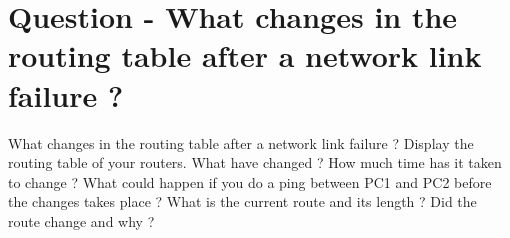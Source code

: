 \section{Question - What changes in the routing table after a network link failure ?}

\begin{questionBox}{What changes in the routing table after a network link failure ?}
    Display the routing table of your routers. What have changed ? How much time has it taken to change ? What could happen if you do a ping between PC1 and PC2 before the changes takes place ? What is the current route and its length ? Did the route change and why ?
\end{questionBox}
